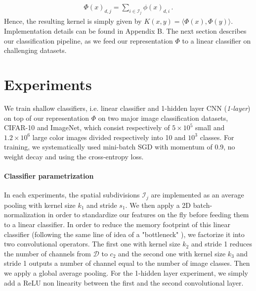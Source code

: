 \documentclass{article} %
\begin{document}
\begin{align}\Phi(x)_{d,j}= \sum_{i\in \mathcal{I}_j}\phi(x)_{d,i}\,.\end{align}
Hence, the resulting kernel is simply given by $K(x,y)= \langle \Phi(x),\Phi(y)\rangle $. Implementation details can be found in Appendix B. The next section describes our classification pipeline, as we feed our representation $\Phi$ to a linear classifier on challenging datasets.
\section{Experiments}
\label{experiments}
We train  shallow classifiers, i.e. linear classifier and 1-hidden layer CNN (\textit{1-layer}) on top of our representation $\Phi$ on two major  image classification datasets,  CIFAR-10 and ImageNet, which consist respectively of $5\times10^5$ small and $1.2\times10^6$ large color images  divided respectively into 10 and $10^3$ classes.
For training, we systematically used mini-batch SGD with momentum of 0.9, no weight decay and using the cross-entropy loss.


\paragraph{Classifier parametrization} In each experiments, the spatial subdivisions $\mathcal{I}_j$ are implemented as an average pooling with kernel size $k_1$ and stride $s_1$.
We then apply a 2D batch-normalization \citep{ioffe2015batch} in order to standardize our features on the fly before feeding them to a linear classifier.
In order to reduce the memory footprint of this linear classifier (following the same line of idea of a "bottleneck" \citep{he2016deep}), we factorize it into two convolutional operators.
The first one with kernel size $k_2$ and stride 1 reduces the number of channels from $\mathcal{D}$ to $c_2$ and the second one with kernel size $k_3$ and stride 1 outputs a number of channel equal to the number of image classes.
Then we apply a global average pooling.
For the 1-hidden layer experiment, we simply add a ReLU non linearity between the first and the second convolutional layer.
\end{document}
